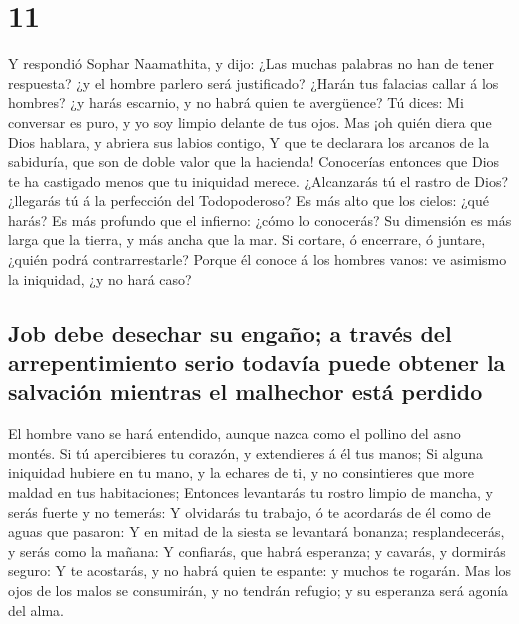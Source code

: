 \hypertarget{section-10}{%
\section{11}\label{section-10}}

 Y respondió Sophar Naamathita, y dijo: 
¿Las muchas palabras no han de tener respuesta? ¿y el hombre parlero
será justificado?  ¿Harán tus falacias callar á los
hombres? ¿y harás escarnio, y no habrá quien te avergüence?
 Tú dices: Mi conversar es puro, y yo soy limpio delante
de tus ojos.  Mas ¡oh quién diera que Dios hablara, y
abriera sus labios contigo,  Y que te declarara los
arcanos de la sabiduría, que son de doble valor que la hacienda!
Conocerías entonces que Dios te ha castigado menos que tu iniquidad
merece.  ¿Alcanzarás tú el rastro de Dios? ¿llegarás tú á
la perfección del Todopoderoso?  Es más alto que los
cielos: ¿qué harás? Es más profundo que el infierno: ¿cómo lo conocerás?
 Su dimensión es más larga que la tierra, y más ancha que
la mar.  Si cortare, ó encerrare, ó juntare, ¿quién podrá
contrarrestarle?  Porque él conoce á los hombres vanos:
ve asimismo la iniquidad, ¿y no hará caso?

\hypertarget{job-debe-desechar-su-engauxf1o-a-travuxe9s-del-arrepentimiento-serio-todavuxeda-puede-obtener-la-salvaciuxf3n-mientras-el-malhechor-estuxe1-perdido}{%
\subsection{Job debe desechar su engaño; a través del arrepentimiento
serio todavía puede obtener la salvación mientras el malhechor está
perdido}\label{job-debe-desechar-su-engauxf1o-a-travuxe9s-del-arrepentimiento-serio-todavuxeda-puede-obtener-la-salvaciuxf3n-mientras-el-malhechor-estuxe1-perdido}}

 El hombre vano se hará entendido, aunque nazca como el
pollino del asno montés.  Si tú apercibieres tu corazón,
y extendieres á él tus manos;  Si alguna iniquidad
hubiere en tu mano, y la echares de ti, y no consintieres que more
maldad en tus habitaciones;  Entonces levantarás tu
rostro limpio de mancha, y serás fuerte y no temerás:  Y
olvidarás tu trabajo, ó te acordarás de él como de aguas que pasaron:
 Y en mitad de la siesta se levantará bonanza;
resplandecerás, y serás como la mañana:  Y confiarás, que
habrá esperanza; y cavarás, y dormirás seguro:  Y te
acostarás, y no habrá quien te espante: y muchos te rogarán.
 Mas los ojos de los malos se consumirán, y no tendrán
refugio; y su esperanza será agonía del alma.


